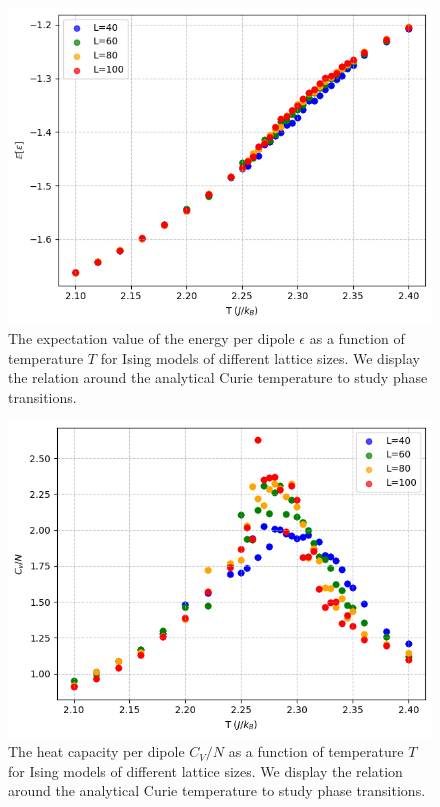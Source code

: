 \documentclass[../main_proj4_correct_template.tex]{subfiles}
\begin{document}
\begin{figure}[h!]
    \centering
    \includegraphics[width=0.8\linewidth]{Project 4/figures/p8_eps.png}
    \caption{The expectation value of the energy per dipole $\epsilon$ as a function of temperature $T$ for Ising models of different lattice sizes. We display the relation around the analytical Curie temperature to study phase transitions.}
    \label{fig:p8_eps}
\end{figure}
\begin{figure}[h!]
    \centering
    \includegraphics[width=0.8\linewidth]{Project 4/figures/p8_cv.png}
    \caption{The heat capacity per dipole $C_V/N$ as a function of temperature $T$ for Ising models of different lattice sizes. We display the relation around the analytical Curie temperature to study phase transitions.}
    \label{fig:p8_cv}
\end{figure}
\end{document}
